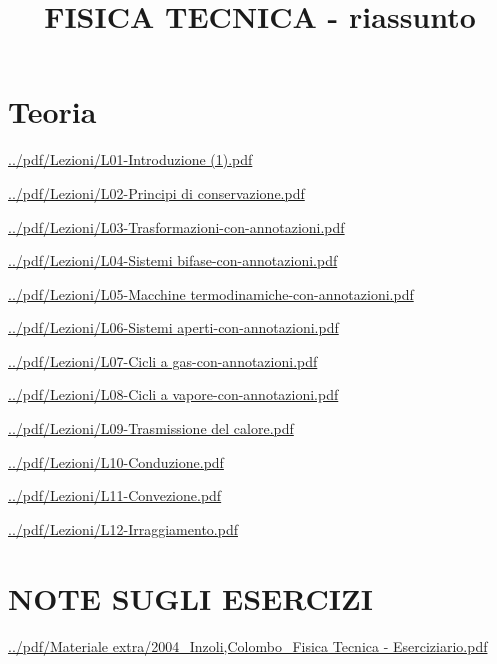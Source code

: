 \documentclass[a4paper, 9pt]{article}
\title{FISICA TECNICA - riassunto}
\begin{document}
    \maketitle
    \tableofcontents{}
    \newpage
    \part{Teoria}
    \newpage
    \url{../pdf/Lezioni/L01-Introduzione (1).pdf}
    
    \newpage
    \url{../pdf/Lezioni/L02-Principi di conservazione.pdf}
    
    \newpage
    \url{../pdf/Lezioni/L03-Trasformazioni-con-annotazioni.pdf}
    
    \newpage
    \url{../pdf/Lezioni/L04-Sistemi bifase-con-annotazioni.pdf}
    
    \newpage
    \url{../pdf/Lezioni/L05-Macchine termodinamiche-con-annotazioni.pdf}
    
    \newpage
    \url{../pdf/Lezioni/L06-Sistemi aperti-con-annotazioni.pdf}
    
    \newpage
    \url{../pdf/Lezioni/L07-Cicli a gas-con-annotazioni.pdf}
    
    \newpage
    \url{../pdf/Lezioni/L08-Cicli a vapore-con-annotazioni.pdf}
    
    \newpage
    \url{../pdf/Lezioni/L09-Trasmissione del calore.pdf}
    
    \newpage
    \url{../pdf/Lezioni/L10-Conduzione.pdf}
    
    \newpage
    \url{../pdf/Lezioni/L11-Convezione.pdf}
    
    \newpage
    \url{../pdf/Lezioni/L12-Irraggiamento.pdf}
    
    \newpage
    \part{NOTE SUGLI ESERCIZI}
    \newpage
    \url{../pdf/Materiale extra/2004_Inzoli,Colombo_Fisica Tecnica - Eserciziario.pdf}
    
\end{document}
